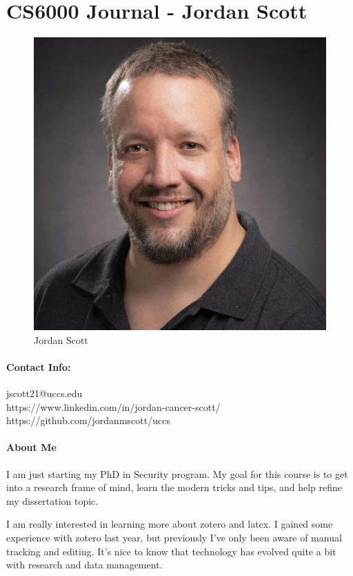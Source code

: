 



%
	
	
	\section{\textbf{CS6000 Journal - Jordan Scott}}
	
	
	\begin{figure}
		\centering
		\includegraphics[width=0.4\linewidth]{jordan.jpg}
		\caption{Jordan Scott}
	\end{figure}

	\paragraph*{Contact Info: } jscott21@uccs.edu \\
	https://www.linkedin.com/in/jordan-cancer-scott/\\
	https://github.com/jordanmscott/uccs


	\paragraph*{About Me}
		
		
		
	I am just starting my PhD in Security program. My goal for this course is to get into a research frame of mind, learn the modern tricks and tips, and help refine my dissertation topic.
	
	
	I am really interested in learning more about zotero and latex. I gained some experience with zotero last year, but previously I've only been aware of manual tracking and editing. It's nice to know that technology has evolved quite a bit with research and data management.
	

